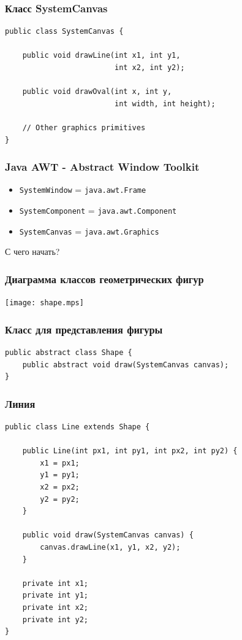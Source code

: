 \documentclass[handout]{beamer}
\begin{document}
\begin{frame}[fragile]
\frametitle{Класс SystemCanvas}
\begin{lstlisting}
public class SystemCanvas {

    public void drawLine(int x1, int y1,
                         int x2, int y2);

    public void drawOval(int x, int y,
                         int width, int height);

    // Other graphics primitives
}
\end{lstlisting}
\end{frame}


\begin{frame}[fragile]
\frametitle{Java AWT - Abstract Window Toolkit}
\begin{itemize}
\item \lstinline{SystemWindow} = \lstinline{java.awt.Frame}
\item \lstinline{SystemComponent} = \lstinline{java.awt.Component}
\item \lstinline{SystemCanvas} = \lstinline{java.awt.Graphics}
\end{itemize}
\end{frame}


\begin{frame}[fragile]
\begin{center}
\huge С чего начать?
\end{center}
\end{frame}


\begin{frame}[fragile]
\frametitle{Диаграмма классов геометрических фигур}
\begin{center}
\texttt{[image: shape.mps]}
\end{center}
\end{frame}


\begin{frame}[fragile]
\frametitle{Класс для представления фигуры}
\begin{lstlisting}
public abstract class Shape {
    public abstract void draw(SystemCanvas canvas);
}
\end{lstlisting}
\end{frame}


\begin{frame}[fragile]
\frametitle{Линия}
\begin{lstlisting}
public class Line extends Shape {

    public Line(int px1, int py1, int px2, int py2) {
        x1 = px1;
        y1 = py1;
        x2 = px2;
        y2 = py2;
    }

    public void draw(SystemCanvas canvas) {
        canvas.drawLine(x1, y1, x2, y2);
    }

    private int x1;
    private int y1;
    private int x2;
    private int y2;
}
\end{lstlisting}
\end{frame}
\end{document}
